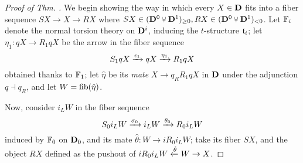 \begin{proof}[Proof of Thm. \protect{\ref{gluing}}]
We begin showing the way in which every $X\in\mathbf{D}$ fits into a fiber sequence $SX\to X\to RX$ where $SX\in (\D^0\glue \D^1)_{\ge 0}, RX\in (\D^0\glue \D^1)_{<0}$. 
Let $\mathbb{F}_i$ denote the normal torsion theory on $\mathbf{D}^i$, inducing the $t$\hyp{}structure $\mathfrak{t}_i$; let $\eta_1 \colon qX\to R_1 qX$ be the arrow in the fiber sequence
\[\label{fibseqofq}
S_1 qX \xrightarrow{\epsilon_1} qX\xrightarrow{\eta_1} R_1 qX
\]
obtained thanks to $\mathbb{F}_1$; let $\hat\eta$ be its \emph{mate} $X\to q_R R_1 qX$ in $\mathbf{D}$ under the adjunction $q\dashv q_R$, and let $W=\text{fib}(\hat \eta)$. 

Now, consider $i_L W$ in the fiber sequence 
\[
S_0 i_L W \xrightarrow{\sigma_0} i_L W \xrightarrow{\theta_0} R_0 i_LW\]
induced by $\mathbb{F}_0$ on $\mathbf{D}_0$, and its mate $\hat \theta\colon W\to i R_0 i_LW$; take its fiber $SX$, and the object $RX$ defined as the pushout of $i R_0 i_L W \xleftarrow{\hat\theta} W \to X$.


\end{proof}
